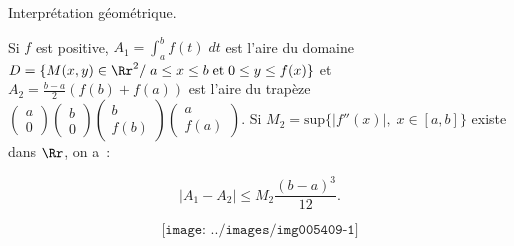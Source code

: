 {{Interprétation géométrique.

Si $f$ est positive, $A_1=\int_{a}^{b}f(t)\;dt$ est l'aire du domaine $D=\{M(x,y)\in\Rr^2/\;a\leq x\leq b\;\mbox{et}\;0\leq y\leq f(x)\}$ et $A_2=\frac{b-a}{2}(f(b)+f(a))$ est l'aire du trapèze $\left(
\begin{array}{c}
a\\
0
\end{array}
\right)\left(
\begin{array}{c}
b\\
0
\end{array}
\right)\left(
\begin{array}{c}
b\\
f(b)
\end{array}
\right)\left(
\begin{array}{c}
a\\
f(a)
\end{array}
\right)$. Si $M_2=\mbox{sup}\{|f''(x)|,\;x\in[a,b]\}$ existe dans $\Rr$, on a~:

$$|A_1-A_2|\leq M_2\frac{(b-a)^3}{12}.$$

$$\texttt{[image: ../images/img005409-1]}$$
}
}
